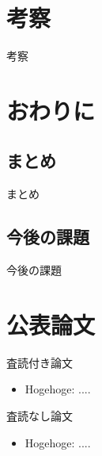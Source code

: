 \documentclass[12pt,dvipdfmx]{jreport}
\begin{document}
\chapter{考察}
考察

\chapter{おわりに}
 \section{まとめ}
 まとめ

 \section{今後の課題}
 今後の課題


\chapter*{公表論文}

\begin{list}%
 {} %
 {} %
 \item 査読付き論文
       \begin{itemize}
	\item Hogehoge: ....
       \end{itemize}
 \item 査読なし論文
       \begin{itemize}
	\item Hogehoge: ....
       \end{itemize}
\end{list}

\newpage

%
\end{document}

